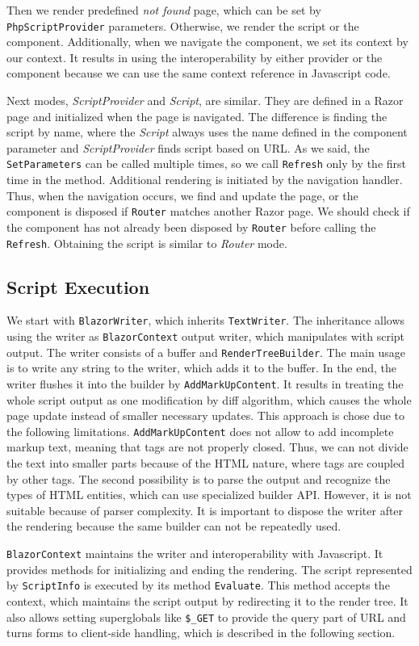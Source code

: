 Then we render predefined \textit{not found} page, which can be set by \texttt{PhpScriptProvider} parameters.
Otherwise, we render the script or the component.
Additionally, when we navigate the component, we set its context by our context.
It results in using the interoperability by either provider or the component because we can use the same context reference in Javascript code.
\par
Next modes, \textit{ScriptProvider} and \textit{Script}, are similar.
They are defined in a Razor page and initialized when the page is navigated.  
The difference is finding the script by name, where the \textit{Script} always uses the name defined in the component parameter and \textit{ScriptProvider} finds script based on URL.
As we said, the \texttt{SetParameters} can be called multiple times, so we call \texttt{Refresh} only by the first time in the method.
Additional rendering is initiated by the navigation handler.
Thus, when the navigation occurs, we find and update the page, or the component is disposed if \texttt{Router} matches another Razor page. 
We should check if the component has not already been disposed by \texttt{Router} before calling the \texttt{Refresh}.
Obtaining the script is similar to \textit{Router} mode.

\subsection{Script Execution}
We start with \texttt{BlazorWriter}, which inherits \texttt{TextWriter}.
The inheritance allows using the writer as \texttt{BlazorContext} output writer, which manipulates with script output.
The writer consists of a buffer and \texttt{RenderTreeBuilder}.
The main usage is to write any string to the writer, which adds it to the buffer.
In the end, the writer flushes it into the builder by \texttt{AddMarkUpContent}.
It results in treating the whole script output as one modification by diff algorithm, which causes the whole page update instead of smaller necessary updates.
This approach is chose due to the following limitations.
\texttt{AddMarkUpContent} does not allow to add incomplete markup text, meaning that tags are not properly closed.
Thus, we can not divide the text into smaller parts because of the HTML nature, where tags are coupled by other tags.
The second possibility is to parse the output and recognize the types of HTML entities, which can use specialized builder API.
However, it is not suitable because of parser complexity.
It is important to dispose the writer after the rendering because the same builder can not be repeatedly used.
\par
\texttt{BlazorContext} maintains the writer and interoperability with Javascript.
It provides methods for initializing and ending the rendering.
The script represented by \texttt{ScriptInfo} is executed by its method \texttt{Evaluate}. This method accepts the context, which maintains the script output by redirecting it to the render tree.
It also allows setting superglobals like \texttt{\$\_GET} to provide the query part of URL and turns forms to client-side 
handling, which is described in the following section.

